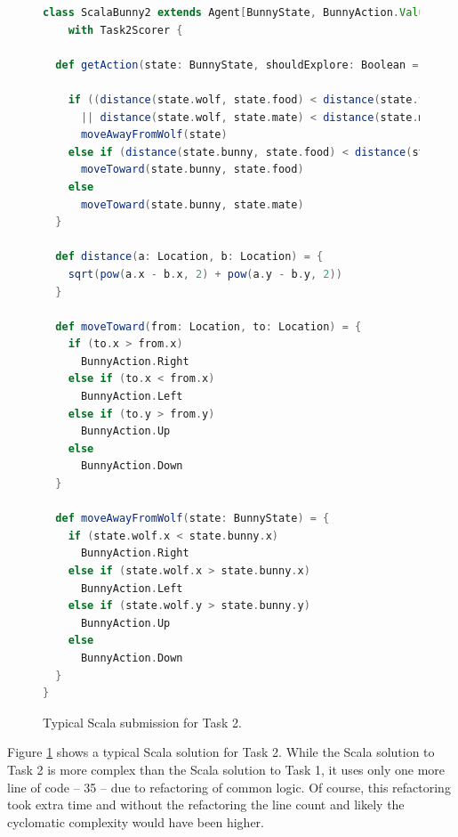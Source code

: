 \begin{figure}[!h]
\begin{center}

\begin{lstlisting}[language=Scala]
class ScalaBunny2 extends Agent[BunnyState, BunnyAction.Value]
    with Task2Scorer {

  def getAction(state: BunnyState, shouldExplore: Boolean = false) = {

    if ((distance(state.wolf, state.food) < distance(state.food, state.bunny))
      || distance(state.wolf, state.mate) < distance(state.mate, state.bunny))
      moveAwayFromWolf(state)
    else if (distance(state.bunny, state.food) < distance(state.bunny, state.mate))
      moveToward(state.bunny, state.food)
    else
      moveToward(state.bunny, state.mate)
  }

  def distance(a: Location, b: Location) = {
    sqrt(pow(a.x - b.x, 2) + pow(a.y - b.y, 2))
  }

  def moveToward(from: Location, to: Location) = {
    if (to.x > from.x)
      BunnyAction.Right
    else if (to.x < from.x)
      BunnyAction.Left
    else if (to.y > from.y)
      BunnyAction.Up
    else
      BunnyAction.Down
  }

  def moveAwayFromWolf(state: BunnyState) = {
    if (state.wolf.x < state.bunny.x)
      BunnyAction.Right
    else if (state.wolf.x > state.bunny.x)
      BunnyAction.Left
    else if (state.wolf.y > state.bunny.y)
      BunnyAction.Up
    else
      BunnyAction.Down
  }
}
\end{lstlisting}

\caption{Typical Scala submission for Task 2.}
\end{center}
\label{fig:scala-task2-submission}
\end{figure}

Figure \ref{fig:scala-task2-submission} shows a typical Scala solution for Task 2. While the Scala solution to Task 2 is more complex than the Scala solution to Task 1, it uses only one more line of code -- 35 -- due to refactoring of common logic. Of course, this refactoring took extra time and without the refactoring the line count and likely the cyclomatic complexity would have been higher.

